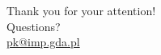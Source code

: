 \documentclass[10pt,aspectratio=169]{beamer} %
\begin{document}
\note{}
{
\begin{frame}[standout]
  Thank you for your attention!\\ \vspace{12pt}
  Questions?\\ \vspace{12pt}
  \url{pk@imp.gda.pl}
\end{frame}
}
\end{document}
